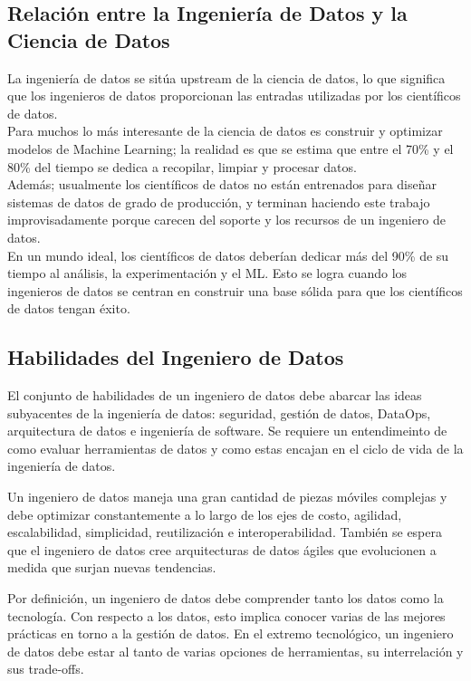 \documentclass[12pt]{book}
\begin{document}
\subsection{Relación entre la Ingeniería de Datos y la Ciencia de Datos}
La ingeniería de datos se sitúa upstream de la ciencia de datos, lo que significa que los ingenieros de datos proporcionan las entradas utilizadas por los científicos de datos.\\
Para muchos lo más interesante de la ciencia de datos es construir y optimizar modelos de Machine Learning; la realidad es que se estima que entre el 70\% y el 80\% del tiempo se dedica a recopilar, limpiar y procesar datos.\\
Además; usualmente los científicos de datos no están entrenados para diseñar sistemas de datos de grado de producción, y terminan haciendo este trabajo improvisadamente porque carecen del soporte y los recursos de un ingeniero de datos.\\
En un mundo ideal, los científicos de datos deberían dedicar más del 90\% de su tiempo al análisis, la experimentación y el ML. Esto se logra cuando los ingenieros de datos se centran en construir una base sólida para que los científicos de datos tengan éxito.

\subsection{Habilidades del Ingeniero de Datos}
El conjunto de habilidades de un ingeniero de datos debe abarcar las ideas subyacentes de la ingeniería de datos: seguridad, gestión de datos, DataOps, arquitectura de datos e ingeniería de software. Se requiere un entendimeinto de como evaluar herramientas de datos y como estas encajan en el ciclo de vida de la ingeniería de datos. 

Un ingeniero de datos maneja una gran cantidad de piezas móviles complejas y debe optimizar constantemente a lo largo de los ejes de costo, agilidad, escalabilidad, simplicidad, reutilización e interoperabilidad. También se espera que el ingeniero de datos cree arquitecturas de datos ágiles que evolucionen a medida que surjan nuevas tendencias.

Por definición, un ingeniero de datos debe comprender tanto los datos como la tecnología. Con respecto a los datos, esto implica conocer varias de las mejores prácticas en torno a la gestión de datos. En el extremo tecnológico, un ingeniero de datos debe estar al tanto de varias opciones de herramientas, su interrelación y sus trade-offs.
\end{document}
